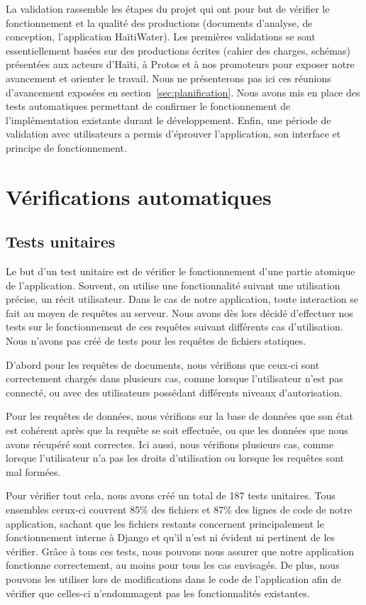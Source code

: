 \documentclass{EPL-master-thesis-covers-FR}
\begin{document}
		La validation rassemble les étapes du projet qui ont pour but de vérifier le fonctionnement et la qualité des productions (documents d'analyse, de conception, l'application HaïtiWater). Les premières validations se sont essentiellement basées sur des productions écrites (cahier des charges, schémas) présentées aux acteurs d'Haïti, à Protos et à nos promoteurs pour exposer notre avancement et orienter le travail. Nous ne présenterons pas ici ces réunions d'avancement exposées en section~\ref{sec:planification}. Nous avons mis en place des tests automatiques permettant de confirmer le fonctionnement de l'implémentation existante durant le développement. Enfin, une période de validation avec utilisateurs a permis d'éprouver l'application, son interface et principe de fonctionnement.


		\section{Vérifications automatiques}

			\subsection*{Tests unitaires}

				Le but d'un test unitaire est de vérifier le fonctionnement d'une partie atomique de l'application. Souvent, on utilise une fonctionnalité suivant une utilisation précise, un récit utilisateur. Dans le cas de notre application, toute interaction se fait au moyen de requêtes au serveur. Nous avons dès lors décidé d'effectuer nos tests sur le fonctionnement de ces requêtes suivant différents cas d'utilisation. Nous n'avons pas créé de tests pour les requêtes de fichiers statiques.

				D'abord pour les requêtes de documents, nous vérifions que ceux-ci sont correctement chargés dans plusieurs cas, comme lorsque l'utilisateur n'est pas connecté, ou avec des utilisateurs possédant différents niveaux d'autorisation.

				Pour les requêtes de données, nous vérifions sur la base de données que son état est cohérent après que la requête se soit effectuée, ou que les données que nous avons récupéré sont correctes. Ici aussi, nous vérifions plusieurs cas, comme lorsque l'utilisateur n'a pas les droits d'utilisation ou lorsque les requêtes sont mal formées.

				Pour vérifier tout cela, nous avons créé un total de 187 tests unitaires. Tous ensembles cerux-ci couvrent 85\% des fichiers et 87\% des lignes de code de notre application, sachant que les fichiers restants concernent principalement le fonctionnement interne à Django et qu'il n'est ni évident ni pertinent de les vérifier. Grâce à tous ces tests, nous pouvons nous assurer que notre application fonctionne correctement, au moins pour tous les cas envisagés. De plus, nous pouvons les utiliser lors de modifications dans le code de l'application afin de vérifier que celles-ci n'endommagent pas les fonctionnalités existantes.
\end{document}
